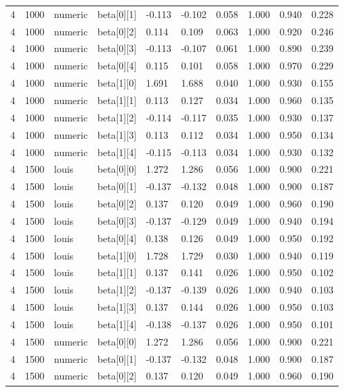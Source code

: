 \begin{table}
\begin{tabular}{llllllllll}
4 & 1000 & numeric & beta[0][1] & -0.113 & -0.102 & 0.058 & 1.000 & 0.940 & 0.228 \\
4 & 1000 & numeric & beta[0][2] & 0.114 & 0.109 & 0.063 & 1.000 & 0.920 & 0.246 \\
4 & 1000 & numeric & beta[0][3] & -0.113 & -0.107 & 0.061 & 1.000 & 0.890 & 0.239 \\
4 & 1000 & numeric & beta[0][4] & 0.115 & 0.101 & 0.058 & 1.000 & 0.970 & 0.229 \\
4 & 1000 & numeric & beta[1][0] & 1.691 & 1.688 & 0.040 & 1.000 & 0.930 & 0.155 \\
4 & 1000 & numeric & beta[1][1] & 0.113 & 0.127 & 0.034 & 1.000 & 0.960 & 0.135 \\
4 & 1000 & numeric & beta[1][2] & -0.114 & -0.117 & 0.035 & 1.000 & 0.930 & 0.137 \\
4 & 1000 & numeric & beta[1][3] & 0.113 & 0.112 & 0.034 & 1.000 & 0.950 & 0.134 \\
4 & 1000 & numeric & beta[1][4] & -0.115 & -0.113 & 0.034 & 1.000 & 0.930 & 0.132 \\
4 & 1500 & louis & beta[0][0] & 1.272 & 1.286 & 0.056 & 1.000 & 0.900 & 0.221 \\
4 & 1500 & louis & beta[0][1] & -0.137 & -0.132 & 0.048 & 1.000 & 0.900 & 0.187 \\
4 & 1500 & louis & beta[0][2] & 0.137 & 0.120 & 0.049 & 1.000 & 0.960 & 0.190 \\
4 & 1500 & louis & beta[0][3] & -0.137 & -0.129 & 0.049 & 1.000 & 0.940 & 0.194 \\
4 & 1500 & louis & beta[0][4] & 0.138 & 0.126 & 0.049 & 1.000 & 0.950 & 0.192 \\
4 & 1500 & louis & beta[1][0] & 1.728 & 1.729 & 0.030 & 1.000 & 0.940 & 0.119 \\
4 & 1500 & louis & beta[1][1] & 0.137 & 0.141 & 0.026 & 1.000 & 0.950 & 0.102 \\
4 & 1500 & louis & beta[1][2] & -0.137 & -0.139 & 0.026 & 1.000 & 0.940 & 0.103 \\
4 & 1500 & louis & beta[1][3] & 0.137 & 0.144 & 0.026 & 1.000 & 0.950 & 0.103 \\
4 & 1500 & louis & beta[1][4] & -0.138 & -0.137 & 0.026 & 1.000 & 0.950 & 0.101 \\
4 & 1500 & numeric & beta[0][0] & 1.272 & 1.286 & 0.056 & 1.000 & 0.900 & 0.221 \\
4 & 1500 & numeric & beta[0][1] & -0.137 & -0.132 & 0.048 & 1.000 & 0.900 & 0.187 \\
4 & 1500 & numeric & beta[0][2] & 0.137 & 0.120 & 0.049 & 1.000 & 0.960 & 0.190 \\

\end{tabular}
\end{table}
